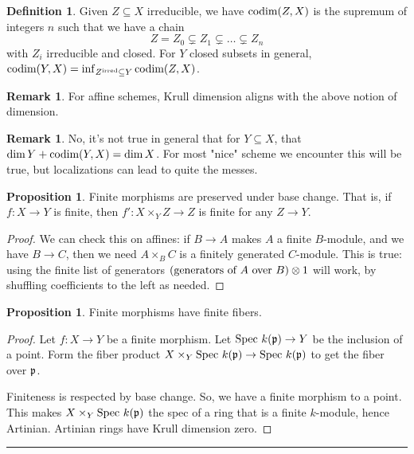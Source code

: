 \documentclass[10pt,reqno]{amsart}
\theoremstyle{definition}
\newtheorem{definition}[theorem]{Definition}
\newtheorem{proposition}[theorem]{Proposition}
\newtheorem{remark}[theorem]{Remark}
\theoremstyle{remark}
\numberwithin{equation}{section}
\numberwithin{theorem}{section}
\newcommand{\spec}{\textup{Spec }}
\newcommand{\codim}{\textup{codim}}
\newcommand{\pp}{\frak{p}}
\begin{document}
\begin{definition} Given $Z \subseteq X$ irreducible, we have $\codim(Z,X)$ is the supremum of integers $n$ such that we have a chain
\[Z = Z_0 \subsetneq Z_1 \subsetneq \dots \subsetneq Z_n\]
with $Z_i$ irreducible and closed. For $Y$ closed subsets in general, $\codim(Y,X) = \inf_{Z^{\textup{irred}} \subseteq Y} \codim(Z,X)$.
\end{definition}

\begin{remark} For affine schemes, Krull dimension aligns with the above notion of dimension.
\end{remark}

\begin{remark} No, it's not true in general that for $Y \subseteq X$, that $\dim Y + \codim(Y,X) = \dim X$. For most "nice" scheme we encounter this will be true, but localizations can lead to quite the messes.
\end{remark}

\begin{proposition} Finite morphisms are preserved under base change. That is, if $f: X \to Y$ is finite, then $f':X \times_Y Z \to Z$ is finite for any $Z \to Y$.
\end{proposition}
\begin{proof} We can check this on affines: if $B \to A$ makes $A$ a finite $B$-module, and we have $B \to C$, then we need $A \times_B C$ is a finitely generated $C$-module. This is true: using the finite list of generators $(\textup{generators of $A$ over $B$}) \otimes 1$ will work, by shuffling coefficients to the left as needed.
\end{proof}

\begin{proposition} Finite morphisms have finite fibers.
\end{proposition}
\begin{proof}
 Let $f: X \to Y$ be a finite morphism. Let $\spec k(\pp) \to Y$ be the inclusion of a point. Form the fiber product $X \times_Y \spec k(\pp) \to \spec k(\pp)$ to get the fiber over $\pp$.
 
 Finiteness is respected by base change. So, we have a finite morphism to a point. This makes $X \times_Y \spec k(\pp)$ the spec of a ring that is a finite $k$-module, hence Artinian. Artinian rings have Krull dimension zero.
 \end{proof}
 
 \hrule
 \vspace{1em}
 
\end{document}

